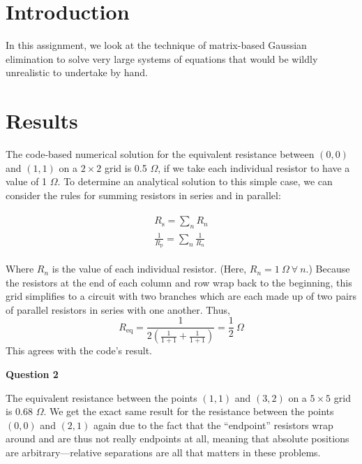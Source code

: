 \documentclass{article}
\author{\hwauthor}
\title{\hwtitle}
\date{\hwdate}
\begin{document}
\maketitle
\thispagestyle{fancy}

\section{Introduction}

In this assignment, we look at the technique of matrix-based Gaussian elimination to solve very large systems of equations that would be wildly unrealistic to undertake by hand.

\section{Results}

\bigskip
{}
\medskip

The code-based numerical solution for the equivalent resistance between $(0,0)$ and $(1,1)$ on a $2\times2$ grid is 0.5 $\Omega$, if we take each individual resistor to have a value of 1 $\Omega$. To determine an analytical solution to this simple case, we can consider the rules for summing resistors in series and in parallel:

\begin{gather*}
              \begin{aligned}
               R_{\text{s}} = \sum_{n} {R_n} \\ 
               \frac{1}{R_{\text{p}}} = \sum_{n} {\frac{1}{R_n}}
             \end{aligned}
\end{gather*}

Where $R_n$ is the value of each individual resistor. (Here, $R_n = 1\ \Omega\ \forall\ n$.) Because the resistors at the end of each column and row wrap back to the beginning, this grid simplifies to a circuit with two branches which are each made up of two pairs of parallel resistors in series with one another. Thus,
\begin{equation*}
    R_\text{eq} = \frac{1}{2\left(\frac{1}{1+1}+\frac{1}{1+1}\right)} = \frac{1}{2}\ \Omega
\end{equation*}
This agrees with the code's result.

\bigskip
{\bf Question 2}
\medskip

The equivalent resistance between the points $(1,1)$ and $(3,2)$ on a $5\times5$ grid is 0.68 $\Omega$. We get the exact same result for the resistance between the points $(0,0)$ and $(2,1)$ again due to the fact that the ``endpoint'' resistors wrap around and are thus not really endpoints at all, meaning that absolute positions are arbitrary---relative separations are all that matters in these problems.
\end{document}
